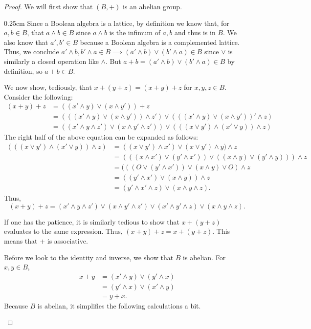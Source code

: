 \documentclass[10pt, letterpaper]{article}
\newenvironment{tabOver}[1]
{\begin{adjustwidth}{#1cm}{}}{\end{adjustwidth}}
\theoremstyle{definition}
\begin{document}
\begin{proof}
	We will first show that \((B, +)\) is an abelian group.
	\begin{tabOver}{0.25}
		Since a Boolean algebra is a lattice, by definition we know that,
		for \(a,b\in B\), that \(a\wedge b\in B\) since \(a\wedge b\) is the infimum
		of \(a,b\) and thus is in \(B\). We also know that \(a',b'\in B\) because 
		a Boolean algebra is a complemented lattice. Thus, we conclude
		\(a'\wedge b, b'\wedge a\in B\implies (a'\wedge b)\vee (b'\wedge a)\in B\)
		since \(\vee\) is similarly a closed operation like \(\wedge\).
		But \(a+b= (a'\wedge b)\vee (b'\wedge a)\in B\) by definition, so \(a+b\in B\).

		We now show, tediously, that \(x+(y+z)=(x+y)+z\) for \(x,y,z\in B\).
		Consider the following:
		\begin{align*}
			(x+y)+z&=((x'\wedge y)\vee(x\wedge y'))+z \\
				   &=(((x'\wedge y)\vee(x\wedge y'))\wedge z')\vee
				     (((x'\wedge y)\vee(x\wedge y'))'\wedge z) \\
				   &=((x'\wedge y\wedge z')\vee(x\wedge y'\wedge z'))\vee
				     (((x\vee y')\wedge(x'\vee y))\wedge z)
		\end{align*}
		The right half of the above equation can be expanded as follows:
		\begin{align*}
		(((x\vee y')\wedge(x'\vee y))\wedge z)&=
			((x\vee y')\wedge x')\vee(x\vee y')\wedge y)\wedge z \\
		&=(((x\wedge x')\vee(y'\wedge x'))\vee((x\wedge y)\vee (y'\wedge y)))\wedge z \\
		&=(((O\vee(y'\wedge x'))\vee(x\wedge y)\vee O)\wedge z \\
		&=((y'\wedge x')\vee(x\wedge y))\wedge z \\
		&=(y'\wedge x'\wedge z)\vee (x\wedge y\wedge z).
		\end{align*}
		Thus, \[(x+y)+z = (x'\wedge y\wedge z')\vee(x\wedge y'\wedge z')
				\vee(x'\wedge y'\wedge z)\vee(x\wedge y\wedge z).\]

		If one has the patience, it is similarly tedious to show that \(x+(y+z)\) evaluates
		to the same expression. Thus, \((x+y)+z=x+(y+z)\). This means that $+$ is associative.

		Before we look to the identity and inverse, we show that \(B\) is abelian.
		For \(x,y\in B\),
		\begin{align*}
			x+y&=(x'\wedge y)\vee(y'\wedge x) \\
			   &=(y'\wedge x)\vee (x'\wedge y) \\
			   &=y+x.
		\end{align*}
		Because \(B\) is abelian, it simplifies the following calculations a bit.


\end{tabOver}
\end{proof}
\end{document}
